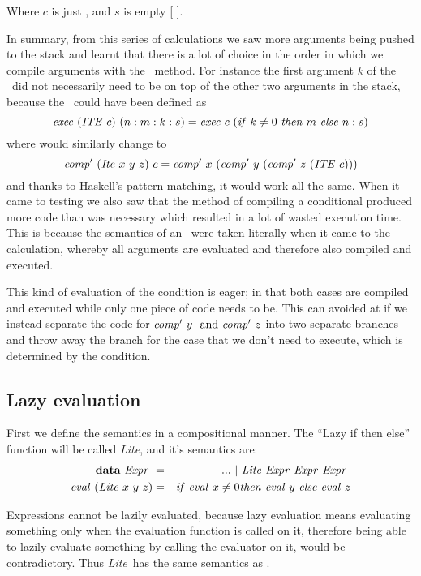 \documentclass {article}
\begin{document}
\noindent Where $c$ is just \HALTt, and $s$ is empty [ ].

In summary, from this series of calculations we saw more
arguments being pushed to the stack and learnt that
there is a lot of choice in the order in which we
compile arguments with the \BH\ method. 
For instance the first argument $k$
of the \ite\ did not necessarily need to be on top
of the other two arguments in the stack, because
the \exec\ could have been defined as
\[ \mathit{exec\ } (\mathit{ITE\ } c)\ (n:m:k:s) 
		= \mathit{exec\ } c\ (\mathit{if\ } k \not= 0\ \mathit{then\ } m\ \mathit{else\ } n:s) \]
\noindent where \compp would similarly change to
\[ \mathit{comp'\ } (\mathit{Ite\ } x\ y\ z)\ c = 
		\mathit{comp'\ }  x\ (\mathit{comp'\ }  y\ (\mathit{comp'\ }  z\ (\mathit{ITE\ } c))) \]
\noindent and thanks to Haskell's pattern matching,
it would work all the same.
When it came to testing we also saw that the method
of compiling a conditional produced more code than was 
necessary which resulted in a lot of wasted
execution time. 
This is because the semantics of an \ite\ were
taken literally when it came to the calculation,
whereby all arguments are evaluated
and therefore also compiled and executed.

This kind of evaluation of the condition
is eager; in that both cases are compiled and executed
while only one piece of code needs to be.
This can avoided at if we instead
separate the code for
\( \mathit{comp'\ }  y\ \mbox{ and } \mathit{comp'\ }  z \) 
into two separate branches
and throw away the branch for the case
that we don't need to execute, which
is determined by the condition.

\pagebreak
\subsection{Lazy evaluation}

\newcommand{\lite}{\textit{Lite}}
\newcommand{\Lite}{\mathit{Lite\ }}
First we define the semantics 
in a compositional manner.
The ``Lazy if then else'' function
 will be called \lite, and it's semantics are:
 \begin{eqnarray}
 \textbf{data}\ \Expr &=& ...\ |\ \Lite \Expr \Expr \Expr \nonumber \\
 \evalf (\Lite x\ y\ z)
	&=& \ifff \evalf  x \not= 0 \tthen \evalf  y\ \eelse \evalf  z 
			\label{evallite}
 \end{eqnarray}

Expressions cannot be lazily evaluated,
because lazy evaluation means evaluating
something only when the evaluation function
is called on it,
therefore being able to lazily evaluate something 
by calling the evaluator on it,
would be contradictory.
Thus \lite\ has the same semantics
as \ite.
\end{document}
